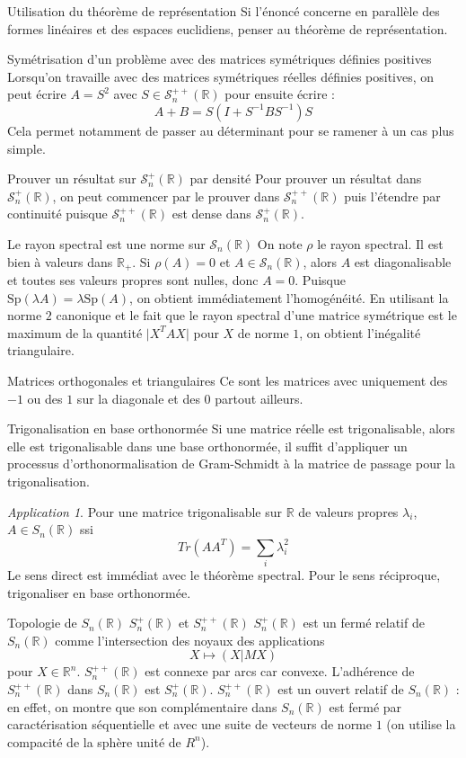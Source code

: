 \documentclass[french]{book}
\newcommand{\R}{\mathbb{R}}
\newcommand{\inv}{^{-1}}
\theoremstyle{plain}
\theoremstyle{definition}
\theoremstyle{remark}
\newtheorem*{app}{Application}
\begin{document}
\begin{AS}{Utilisation du théorème de représentation} Si l'énoncé concerne en parallèle des formes linéaires et des espaces euclidiens, penser au théorème de représentation.
\end{AS}
\begin{AS}{Symétrisation d'un problème avec des matrices symétriques définies positives} Lorsqu'on travaille avec des matrices symétriques réelles définies positives, on peut écrire $A=S^2$ avec $S\in\mathcal{S}_n^{++}(\R)$ pour ensuite écrire : $$A+B=S(I+S\inv BS\inv)S$$ Cela permet notamment de passer au déterminant pour se ramener à un cas plus simple.
\end{AS}
\begin{AS}{Prouver un résultat sur $\mathcal{S}_n^+(\R)$ par densité} Pour prouver un résultat dans $\mathcal{S}_n^+(\R)$, on peut commencer par le prouver dans $\mathcal{S}_n^{++}(\R)$ puis l'étendre par continuité puisque $\mathcal{S}_n^{++}(\R)$ est dense dans $\mathcal{S}_n^+(\R)$.
\end{AS}
\begin{AS}{Le rayon spectral est une norme sur $\mathcal{S}_n(\R)$} On note $\rho$ le rayon spectral. Il est bien à valeurs dans $\R_+$. Si $\rho(A)=0$ et $A\in\mathcal{S}_n(\R)$, alors $A$ est diagonalisable et toutes ses valeurs propres sont nulles, donc $A=0$. Puisque $\text{Sp}(\lambda A)=\lambda\text{Sp}(A)$, on obtient immédiatement l'homogénéité. En utilisant la norme $2$ canonique et le fait que le rayon spectral d'une matrice symétrique est le maximum de la quantité $\lvert X^TAX\rvert$ pour $X$ de norme $1$, on obtient l'inégalité triangulaire.
\end{AS}
\begin{AS}{Matrices orthogonales et triangulaires} Ce sont les matrices avec uniquement des $-1$ ou des $1$ sur la diagonale et des $0$ partout ailleurs.
\end{AS}
\begin{AS}{Trigonalisation en base orthonormée} Si une matrice réelle est trigonalisable, alors elle est trigonalisable dans une base orthonormée, il suffit d'appliquer un processus d'orthonormalisation de Gram-Schmidt à la matrice de passage pour la trigonalisation. 
\end{AS}\begin{app} Pour une matrice trigonalisable sur $\R$ de valeurs propres $\lambda_i$, $A\in S_n(\R)$ ssi $$Tr\left(AA^T\right)=\sum_{i}\lambda_i^2$$ Le sens direct est immédiat avec le théorème spectral. Pour le sens réciproque, trigonaliser en base orthonormée. \end{app}
\begin{AS}{Topologie de $S_n(\R)$ $S_n^+(\R)$ et $S_n^{++}(\R)$} $S_n^+(\R)$ est un fermé relatif de $S_n(\R)$ comme l'intersection des noyaux des applications $$X\mapsto (X|MX)$$ pour $X\in\R^n$. $S_n^{++}(\R)$ est connexe par arcs car convexe. L'adhérence de $S_n^{++}(\R)$ dans $S_n(\R)$ est $S_n^+(\R)$. $S_n^{++}(\R)$ est un ouvert relatif de $S_n(\R)$ : en effet, on montre que son complémentaire dans $S_n(\R)$ est fermé par caractérisation séquentielle et avec une suite de vecteurs de norme $1$ (on utilise la compacité de la sphère unité de $R^n$).
\end{AS}
\end{document}
